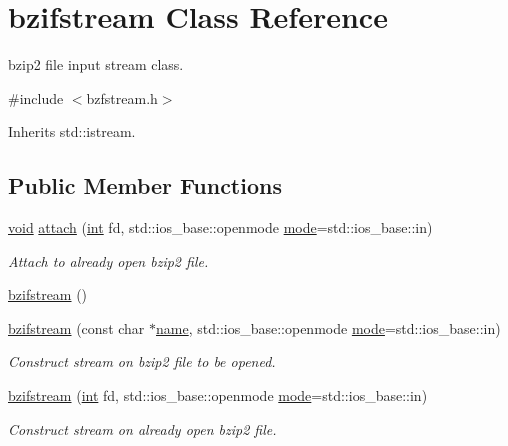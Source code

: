 \hypertarget{classbzifstream}{}\section{bzifstream Class Reference}
\label{classbzifstream}


bzip2 file input stream class.  




{\ttfamily \#include $<$bzfstream.\+h$>$}



Inherits std\+::istream.

\subsection*{Public Member Functions}
\begin{DoxyCompactItemize}
\item 
\hyperlink{lp__lib_8h_ac7828c7b2b31d2e11af17bdb6289c5d9}{void} \hyperlink{classbzifstream_a1f7afe283be87635e25b3f48bc16ea8c}{attach} (\hyperlink{lp__lib_8h_adeb9ec6400320e4923ac9d836d509ddb}{int} fd, std\+::ios\+\_\+base\+::openmode \hyperlink{ioapi_8h_ab77191763734fbb3e515371393ccb606}{mode}=std\+::ios\+\_\+base\+::in)
\begin{DoxyCompactList}\small\item\em Attach to already open bzip2 file. \end{DoxyCompactList}\item 
\hyperlink{classbzifstream_a29da9b74472478ba184f4b56eaa8eed3}{bzifstream} ()
\item 
\hyperlink{classbzifstream_a47dfbb262a812ab111fbae3c904e2d80}{bzifstream} (const char $\ast$\hyperlink{lp__lib_8h_a2946c588fc7fa2fa5b43ac54b7872725}{name}, std\+::ios\+\_\+base\+::openmode \hyperlink{ioapi_8h_ab77191763734fbb3e515371393ccb606}{mode}=std\+::ios\+\_\+base\+::in)
\begin{DoxyCompactList}\small\item\em Construct stream on bzip2 file to be opened. \end{DoxyCompactList}\item 
\hyperlink{classbzifstream_ab60c53e07d9a3732095906f06350c0fb}{bzifstream} (\hyperlink{lp__lib_8h_adeb9ec6400320e4923ac9d836d509ddb}{int} fd, std\+::ios\+\_\+base\+::openmode \hyperlink{ioapi_8h_ab77191763734fbb3e515371393ccb606}{mode}=std\+::ios\+\_\+base\+::in)
\begin{DoxyCompactList}\small\item\em Construct stream on already open bzip2 file. \end{DoxyCompactList}\item 

\end{DoxyCompactItemize}
